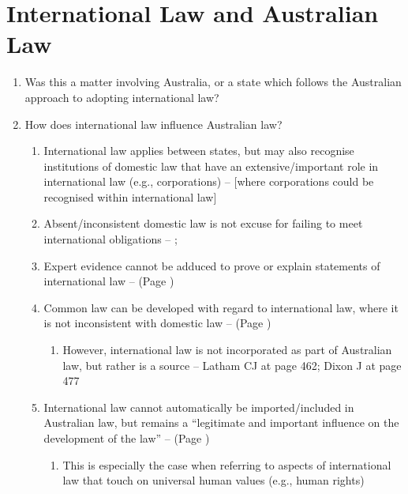 \section{International Law and Australian Law}
\begin{enumerate}
    \item Was this a matter involving Australia, or a state which follows the Australian approach to adopting international law?
    \item How does international law influence Australian law?
    \begin{enumerate}
        \item International law applies between states, but may also recognise institutions of domestic law that have an extensive/important role in international law (e.g., corporations) --  [where corporations could be recognised within international law]
        \item Absent/inconsistent domestic law is not excuse for failing to meet international obligations -- ; 
        \item Expert evidence cannot be adduced to prove or explain statements of international law --  (Page \pageref{case:ACCC v Garuda})
        \item Common law can be developed with regard to international law, where it is not inconsistent with domestic law --  (Page \pageref{case:Chow Hung Ching})
        \begin{enumerate}
            \item However, international law is not incorporated as part of Australian law, but rather is a source -- Latham CJ at page 462; Dixon J at page 477
        \end{enumerate}
        \item International law cannot automatically be imported/included in Australian law, but remains a ``legitimate and important influence on the development of the law'' --  (Page \pageref{case: Mabo})
        \begin{enumerate}
            \item This is especially the case when referring to aspects of international law that touch on universal human values (e.g., human rights)

\end{enumerate}
\end{enumerate}
\end{enumerate}
